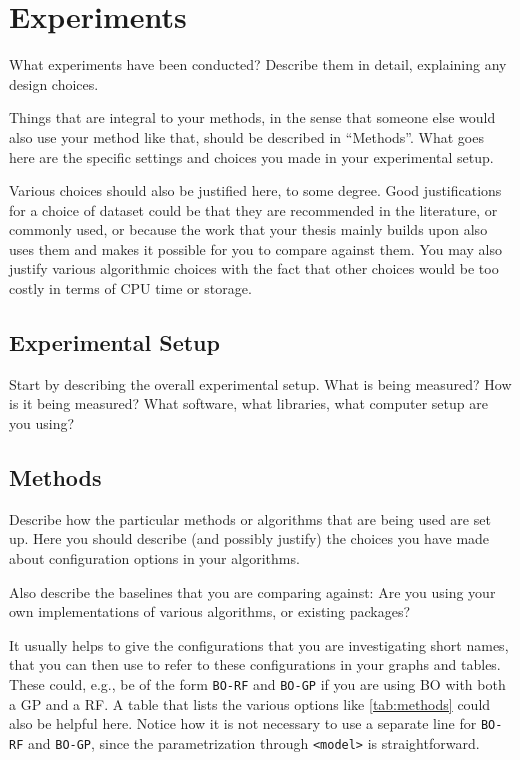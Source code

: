 \chapter{Experiments}\label{chap:experiments}

What experiments have been conducted?
Describe them in detail, explaining any design choices.

Things that are integral to your methods, in the sense that someone else would also use your method like that, should be described in ``Methods''.
What goes here are the specific settings and choices you made in your experimental setup.

Various choices should also be justified here, to some degree.
Good justifications for a choice of dataset could be that they are recommended in the literature, or commonly used, or because the work that your thesis mainly builds upon also uses them and makes it possible for you to compare against them.
You may also justify various algorithmic choices with the fact that other choices would be too costly in terms of CPU time or storage.


\section{Experimental Setup}\label{sec:experimental-setup}

Start by describing the overall experimental setup.
What is being measured?
How is it being measured?
What software, what libraries, what computer setup are you using?

\section{Methods}\label{sec:experimental-methods}

Describe how the particular methods or algorithms that are being used are set up.
Here you should describe (and possibly justify) the choices you have made about configuration options in your algorithms.

Also describe the baselines that you are comparing against:
Are you using your own implementations of various algorithms, or existing packages?

It usually helps to give the configurations that you are investigating short names, that you can then use to refer to these configurations in your graphs and tables.
These could, e.g., be of the form \texttt{BO-RF} and \texttt{BO-GP} if you are using \acrfull{BO} with both a \acrfull{GP} and a \acrfull{RF}.
A table that lists the various options like \cref{tab:methods} could also be helpful here.
Notice how it is not necessary to use a separate line for \texttt{BO-RF} and \texttt{BO-GP}, since the parametrization through \texttt{<model>} is straightforward.

